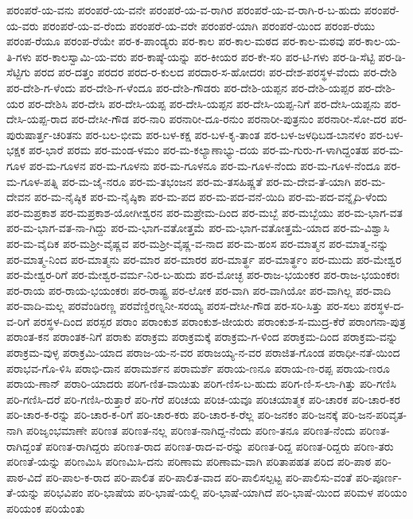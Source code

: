 ಪರಂಪರೆ-ಯ-ವನು
ಪರಂಪರೆ-ಯ-ವನೇ
ಪರಂಪರೆ-ಯ-ವ-ರಾಗಿರ
ಪರಂಪರೆ-ಯ-ವ-ರಾಗಿ-ರ-ಬ-ಹುದು
ಪರಂಪರೆ-ಯ-ವರು
ಪರಂಪರೆ-ಯ-ವ-ರೆಂದು
ಪರಂಪರೆ-ಯ-ವರೇ
ಪರಂಪರೆ-ಯಾಗಿ
ಪರಂಪರೆ-ಯಿಂದ
ಪರಂಪ-ರೆಯು
ಪರಂಪ-ರೆಯೂ
ಪರಂಪ-ರೆಯೇ
ಪರ-ಕ-ಪಾಂಡ್ಯರು
ಪರ-ಕಾಲ
ಪರ-ಕಾಲ-ಮಠದ
ಪರ-ಕಾಲ-ಮಠವು
ಪರ-ಕಾಲ-ಯ-ತಿ-ಗಳು
ಪರ-ಕಾಲಸ್ವಾಮಿ-ಯ-ವರು
ಪರ-ಕಾಷ್ಠೆ-ಯನ್ನು
ಪರ-ಕೀಯರ
ಪರ-ಕೇ-ಸರಿ
ಪರ-ಟಿ-ಗಳು
ಪರ-ಡಿ-ಸೆಟ್ಟಿ
ಪರ-ಡಿ-ಸೆಟ್ಟಿಗು
ಪರದ
ಪರ-ದತ್ತಂ
ಪರದರ
ಪರದ-ರ-ಕುಲದ
ಪರದಾರ-ಸ-ಹೋದರಃ
ಪರ-ದೇಶ-ಪರಸ್ಥಳ-ವೆಂದು
ಪರ-ದೇಶಿ
ಪರ-ದೇಶಿ-ಗ-ಳೆಂದು
ಪರ-ದೇಶಿ-ಗ-ಳೆಂದೂ
ಪರ-ದೇಶಿ-ಗೌಡರು
ಪರ-ದೇಶಿ-ಯಪ್ಪನ
ಪರ-ದೇಶಿ-ಯಪ್ಪರ
ಪರ-ದೇಶಿ-ಯರ
ಪರ-ದೇಶಿಸಿ
ಪರ-ದೇಸಿ
ಪರ-ದೇಸಿ-ಯಪ್ಪ
ಪರ-ದೇಸಿ-ಯಪ್ಪನ
ಪರ-ದೇಸಿ-ಯಪ್ಪ-ನಿಗೆ
ಪರ-ದೇಸಿ-ಯಪ್ಪನು
ಪರ-ದೇಸಿ-ಯಪ್ಪ-ರಾದ
ಪರ-ದೇಸೀ-ಗೌಡ
ಪರ-ನಾರಿ
ಪರನಾರೀ-ದೂ-ರನುಂ
ಪರನಾರೀ-ಪುತ್ರನುಂ
ಪರನಾರೀ-ಸೋ-ದರ
ಪರ-ಪುರುಷಾರ್ತ್ತ-ಚರಿತನು
ಪರ-ಬಲ-ಭೀಮ
ಪರ-ಬಳ-ಕಕ್ಷ
ಪರ-ಬಳ-ಕೃ-ತಾಂತ
ಪರ-ಬಳ-ಜಳಧಿಬಡ-ಬಾನಳಂ
ಪರ-ಬಳ-ಭಕ್ಷಕ
ಪರ-ಭಾರೆ
ಪರಮ
ಪರ-ಮಂಡ-ಳಮಂ
ಪರ-ಮ-ಕಲ್ಯಾಣಾಭ್ಯು-ದಯ
ಪರ-ಮ-ಗುರು-ಗ-ಳಾಗಿದ್ದಂತಹ
ಪರ-ಮ-ಗೂಳ
ಪರ-ಮ-ಗೂಳನ
ಪರ-ಮ-ಗೂಳನು
ಪರ-ಮ-ಗೂಳನೂ
ಪರ-ಮ-ಗೂಳ-ನೆಂದು
ಪರ-ಮ-ಗೂಳ-ನೆಂದೂ
ಪರ-ಮ-ಗೂಳ-ಪತ್ನಿ
ಪರ-ಮ-ಜೈ-ನರೂ
ಪರ-ಮ-ತಭಂಜನ
ಪರ-ಮ-ತಸಹಿಷ್ಣತೆ
ಪರ-ಮ-ದೇವ-ತೆ-ಯಾಗಿ
ಪರ-ಮ-ದೇವನ
ಪರ-ಮ-ನೈಷ್ಠಿಕ
ಪರ-ಮ-ನೈಷ್ಠಿಕಾ
ಪರ-ಮ-ಪದ
ಪರ-ಮ-ಪದ-ವನೆ-ಯಿದಿ
ಪರ-ಮ-ಪದ-ವನ್ನೈದಿ-ಳೆಂದು
ಪರ-ಮಪ್ರಕಾಶ
ಪರ-ಮಪ್ರಕಾಶ-ಯೋಗೀಶ್ವರನ
ಪರ-ಮಪ್ರೇಮ-ದಿಂದ
ಪರ-ಮಬ್ಬೆ
ಪರ-ಮಬ್ಬೆಯು
ಪರ-ಮ-ಭಾಗ-ವತ
ಪರ-ಮ-ಭಾಗ-ವತ-ನಾ-ಗಿದ್ದು
ಪರ-ಮ-ಭಾಗ-ವತೋತ್ತಮೆ
ಪರ-ಮ-ಭಾಗ-ವತೋತ್ತಮೆ-ಯಾದ
ಪರ-ಮ-ವಿಶ್ವಾಸಿ
ಪರ-ಮ-ವೈದಿಕ
ಪರ-ಮಶ್ರೀ-ವೈಷ್ಣವ
ಪರ-ಮಶ್ರೀ-ವೈಷ್ಣ-ವ-ನಾದ
ಪರ-ಮ-ಹಂಸ
ಪರ-ಮಾತ್ಮನ
ಪರ-ಮಾತ್ಮ-ನನ್ನು
ಪರ-ಮಾತ್ಮ-ನಿಂದ
ಪರ-ಮಾತ್ಮನು
ಪರ-ಮಾರ
ಪರ-ಮಾರರ
ಪರ-ಮಾರ್ತ್ಥ
ಪರ-ಮಾರ್ತ್ಥಂ
ಪರ-ಮುದು
ಪರ-ಮೇಶ್ವರ
ಪರ-ಮೇಶ್ವರ-ರಿಗೆ
ಪರ-ಮೇಶ್ವರ-ವರ್ಮ-ನಿರ-ಬ-ಹುದು
ಪರ-ಮೋಚ್ಛ
ಪರ-ರಾಜ-ಭಯಂಕರ
ಪರ-ರಾಜ-ಭಯಂಕರಃ
ಪರ-ರಾಯ
ಪರ-ರಾಯ-ಭಯಂಕರಃ
ಪರ-ರಾಷ್ಟ್ರ
ಪರ-ಲೋಕ
ಪರ-ವಾಗಿ
ಪರ-ವಾಗಿಯೋ
ಪರ-ವಾಗಿಲ್ಲ
ಪರ-ವಾದಿ
ಪರ-ವಾದಿ-ಮಲ್ಲ
ಪರವೆಂಡಿರಣ್ಣ
ಪರವೆಣ್ಡಿರಣ್ನನೀ-ಸರಯ್ಯ
ಪರಸ-ದೇಸೀ-ಗೌಡ
ಪರ-ಸರಿ-ಸಿತ್ತು
ಪರ-ಸಲು
ಪರಸ್ಥಳ-ದ-ವ-ರಿಗೆ
ಪರಸ್ಥಳ-ದಿಂದ
ಪರಸ್ಪರ
ಪರಾಂ
ಪರಾಂಕುಶ
ಪರಾಂಕುಶ-ಜೀಯರು
ಪರಾಂಕುಶ-ಸ-ಮುದ್ರ-ಕೆರೆ
ಪರಾಂಗನಾ-ಪುತ್ರ
ಪರಾಂತ-ಕನ
ಪರಾಂತಕ-ನಿಗೆ
ಪರಾಕು
ಪರಾಕ್ರಮ
ಪರಾಕ್ರಮಕ್ಕೆ
ಪರಾಕ್ರಮ-ಗ-ಳಿಂದ
ಪರಾಕ್ರಮ-ದಿಂದ
ಪರಾಕ್ರಮ-ವನ್ನು
ಪರಾಕ್ರಮ-ವುಳ್ಳ
ಪರಾಕ್ರಮಿ-ಯಾದ
ಪರಾಜ-ಯ-ನ-ವರ
ಪರಾಜಯ್ಯ-ನ-ವರ
ಪರಾಜಿತ-ಗೊಂಡ
ಪರಾಧೀ-ನತೆ-ಯಿಂದ
ಪರಾಭವ-ಗೊ-ಳಿಸಿ
ಪರಾಭಿ-ದಾನ
ಪರಾಮರ್ಶನ
ಪರಾಮರ್ಶೆ
ಪರಾಯ-ಣನೂ
ಪರಾಯ-ಣ-ರಪ್ಪ
ಪರಾಯ-ಣರೂ
ಪರಾಯ-ಣಾನ್
ಪರಾರಿ-ಯಾದರು
ಪರಿಗ-ಣಿತ-ವಾಯಿತು
ಪರಿಗ-ಣಿಸ-ಬ-ಹುದು
ಪರಿಗ-ಣಿ-ಸ-ಲಾ-ಗಿತ್ತು
ಪರಿ-ಗಣಿಸಿ
ಪರಿ-ಗಣಿಸಿ-ದರೆ
ಪರಿ-ಗಣಿಸಿ-ರುತ್ತಾರೆ
ಪರಿ-ಗೆರೆ
ಪರಿಚಯ
ಪರಿಚ-ಯವೂ
ಪರಿಚಯಾತ್ಮಕ
ಪರಿ-ಚಾರಕ
ಪರಿ-ಚಾರ-ಕರ
ಪರಿ-ಚಾರ-ಕ-ರನ್ನು
ಪರಿ-ಚಾರ-ಕ-ರಿಗೆ
ಪರಿ-ಚಾರ-ಕರು
ಪರಿ-ಚಾರ-ಕ-ರೆಲ್ಲ
ಪರಿ-ಜನಕಂ
ಪರಿ-ಜನಕ್ಕೆ
ಪರಿ-ಜನ-ಪರಿವೃತ-ನಾಗಿ
ಪರಿಜೃಂಭಮಾಣೇ
ಪರಿಣತ
ಪರಿಣತ-ನಲ್ಲ
ಪರಿಣತ-ನಾಗಿದ್ದ-ನೆಂದು
ಪರಿಣ-ತನೂ
ಪರಿಣತ-ನೆಂದು
ಪರಿಣತ-ರಾಗಿದ್ದಂತೆ
ಪರಿಣತ-ರಾಗಿದ್ದರು
ಪರಿಣತ-ರಾದ
ಪರಿಣತ-ರಾದ-ವ-ರನ್ನು
ಪರಿಣತ-ರಿದ್ದ
ಪರಿಣತ-ರಿದ್ದರು
ಪರಿಣ-ತರು
ಪರಿಣತೆ-ಯನ್ನು
ಪರಿಣಮಿಸಿ
ಪರಿಣಮಿಸಿ-ದನು
ಪರಿಣಾಮ
ಪರಿಣಾಮ-ವಾಗಿ
ಪರಿತಾಪಹತ
ಪರಿದ
ಪರಿ-ಪಾಠ
ಪರಿ-ಪಾಠ-ವಿದೆ
ಪರಿ-ಪಾಲ-ಕ-ರಾದ
ಪರಿ-ಪಾಲಿತ
ಪರಿ-ಪಾಲಿತ-ವಾದ
ಪರಿ-ಪಾಲಿಸಲ್ಪಟ್ಟ
ಪರಿ-ಪಾಲಿಸು-ವಂತೆ
ಪರಿ-ಪೂರ್ಣ-ತೆ-ಯನ್ನು
ಪರಿಭವಿಪಂ
ಪರಿ-ಭಾಷೆಯ
ಪರಿ-ಭಾಷೆ-ಯಲ್ಲಿ
ಪರಿ-ಭಾಷೆ-ಯಾಗಿದೆ
ಪರಿ-ಭಾಷೆ-ಯಿಂದ
ಪರಿಮಳ
ಪರಿಯಂ
ಪರಿಯಂಕ
ಪರಿಯೆಂತು
